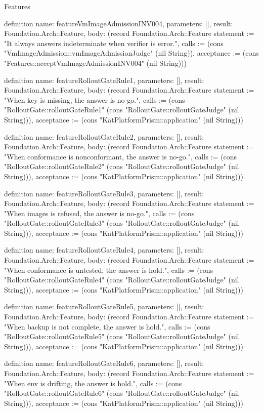 \begin{lexlean}{Features}
\begin{semanticmodule}
definition{
  name: featureVmImageAdmissionINV004,
  parameters: [],
  result: Foundation.Arch::Feature,
  body: (record Foundation.Arch::Feature {statement := "It always answers indeterminate when verifier is error.", calls := (cons "VmImageAdmission::vmImageAdmissionJudge" (nil String)), acceptance := (cons "Features::acceptVmImageAdmissionINV004" (nil String))})
}

definition{
  name: featureRolloutGateRule1,
  parameters: [],
  result: Foundation.Arch::Feature,
  body: (record Foundation.Arch::Feature {statement := "When key is missing, the answer is no-go.", calls := (cons "RolloutGate::rolloutGateRule1" (cons "RolloutGate::rolloutGateJudge" (nil String))), acceptance := (cons "KatPlatformPrism::application" (nil String))})
}

definition{
  name: featureRolloutGateRule2,
  parameters: [],
  result: Foundation.Arch::Feature,
  body: (record Foundation.Arch::Feature {statement := "When conformance is nonconformant, the answer is no-go.", calls := (cons "RolloutGate::rolloutGateRule2" (cons "RolloutGate::rolloutGateJudge" (nil String))), acceptance := (cons "KatPlatformPrism::application" (nil String))})
}

definition{
  name: featureRolloutGateRule3,
  parameters: [],
  result: Foundation.Arch::Feature,
  body: (record Foundation.Arch::Feature {statement := "When images is refused, the answer is no-go.", calls := (cons "RolloutGate::rolloutGateRule3" (cons "RolloutGate::rolloutGateJudge" (nil String))), acceptance := (cons "KatPlatformPrism::application" (nil String))})
}

definition{
  name: featureRolloutGateRule4,
  parameters: [],
  result: Foundation.Arch::Feature,
  body: (record Foundation.Arch::Feature {statement := "When conformance is untested, the answer is hold.", calls := (cons "RolloutGate::rolloutGateRule4" (cons "RolloutGate::rolloutGateJudge" (nil String))), acceptance := (cons "KatPlatformPrism::application" (nil String))})
}

definition{
  name: featureRolloutGateRule5,
  parameters: [],
  result: Foundation.Arch::Feature,
  body: (record Foundation.Arch::Feature {statement := "When backup is not complete, the answer is hold.", calls := (cons "RolloutGate::rolloutGateRule5" (cons "RolloutGate::rolloutGateJudge" (nil String))), acceptance := (cons "KatPlatformPrism::application" (nil String))})
}

definition{
  name: featureRolloutGateRule6,
  parameters: [],
  result: Foundation.Arch::Feature,
  body: (record Foundation.Arch::Feature {statement := "When env is drifting, the answer is hold.", calls := (cons "RolloutGate::rolloutGateRule6" (cons "RolloutGate::rolloutGateJudge" (nil String))), acceptance := (cons "KatPlatformPrism::application" (nil String))})
}


\end{semanticmodule}
\end{lexlean}
